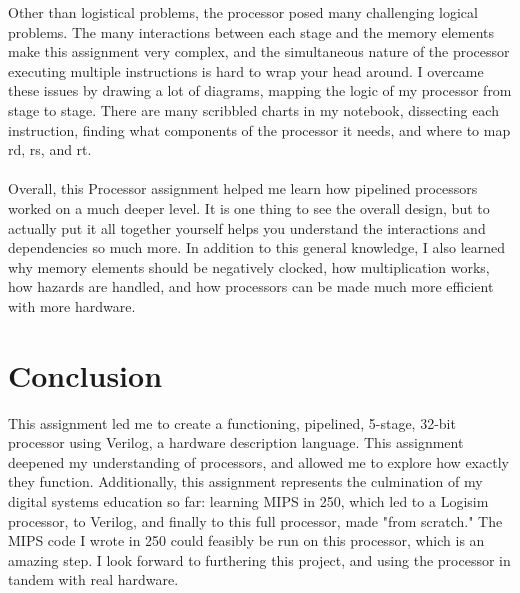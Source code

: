 \documentclass[letterpaper]{article} %
\begin{document}
Other than logistical problems, the processor posed many challenging logical problems. The many interactions between each stage and the memory elements make this assignment very complex, and the simultaneous nature of the processor executing multiple instructions is hard to wrap your head around. I overcame these issues by drawing a lot of diagrams, mapping the logic of my processor from stage to stage. There are many scribbled charts in my notebook, dissecting each instruction, finding what components of the processor it needs, and where to map rd, rs, and rt. \\ \\
Overall, this Processor assignment helped me learn how pipelined processors worked on a much deeper level. It is one thing to see the overall design, but to actually put it all together yourself helps you understand the interactions and dependencies so much more. In addition to this general knowledge, I also learned why memory elements should be negatively clocked, how multiplication works, how hazards are handled, and how processors can be made much more efficient with more hardware. \\

\section*{Conclusion}

This assignment led me to create a functioning, pipelined, 5-stage, 32-bit processor using Verilog, a hardware description language. This assignment deepened my understanding of processors, and allowed me to explore how exactly they function. Additionally, this assignment represents the culmination of my digital systems education so far: learning MIPS in 250, which led to a Logisim processor, to Verilog, and finally to this full processor, made "from scratch." The MIPS code I wrote in 250 could feasibly be run on this processor, which is an amazing step. I look forward to furthering this project, and using the processor in tandem with real hardware.

\newpage
\end{document}
